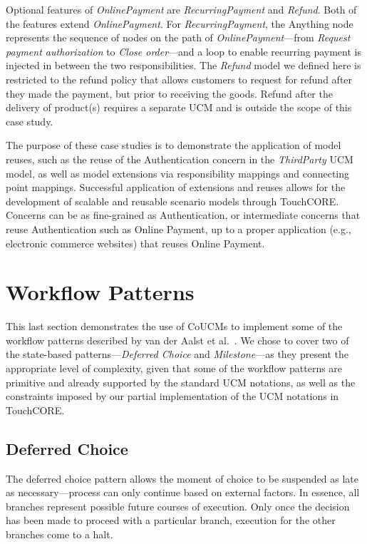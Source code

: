 Optional features of \emph{OnlinePayment} are \emph{RecurringPayment} and \emph{Refund}. Both of the features extend \emph{OnlinePayment}. For \emph{RecurringPayment}, the {\cls Anything} node represents the sequence of nodes on the path of \emph{OnlinePayment}---from \emph{Request payment authorization} to \emph{Close order}---and a loop to enable recurring payment is injected in between the two responsibilities. The \emph{Refund} model we defined here is restricted to the refund policy that allows customers to request for refund after they made the payment, but prior to receiving the goods. Refund after the delivery of product(s) requires a separate UCM and is outside the scope of this case study.

The purpose of these case studies is to demonstrate the application of model reuses, such as the reuse of the Authentication concern in the \emph{ThirdParty} UCM model, as well as model extensions via responsibility mappings and connecting point mappings. Successful application of extensions and reuses allows for the development of scalable and reusable scenario models through TouchCORE. Concerns can be as fine-grained as Authentication, or intermediate concerns that reuse Authentication such as Online Payment, up to a proper application (e.g., electronic commerce websites) that reuses Online Payment.

\section{Workflow Patterns} \label{sec:4.3}

This last section demonstrates the use of CoUCMs to implement some of the workflow patterns described by van der Aalst et al.~\cite{van2003workflow}. We chose to cover two of the state-based patterns---\emph{Deferred Choice} and \emph{Milestone}---as they present the appropriate level of complexity, given that some of the workflow patterns are primitive and already supported by the standard UCM notations, as well as the constraints imposed by our partial implementation of the UCM notations in TouchCORE.

\subsection{Deferred Choice}

The deferred choice pattern allows the moment of choice to be suspended as late as necessary---process can only continue based on external factors. In essence, all branches represent possible future courses of execution. Only once the decision has been made to proceed with a particular branch, execution for the other branches come to a halt. 

